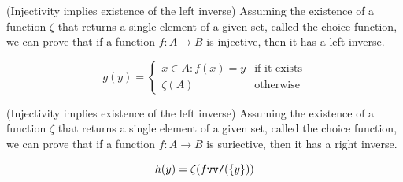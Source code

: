 \begin{lemma}(Injectivity implies existence of the left inverse)
\label{lem:injectiveInverse}
Assuming the existence of a function $\zeta$ that returns a single element of a given set, called the choice function, we can prove 
that if a function $f : A \rightarrow B$ is injective, then it has a left inverse.

\begin{equation*}
    g(y) =
    \begin{cases*}
        x \in A : f(x) = y & \text{if it exists} \\
        \zeta(A)           & \text{otherwise}
    \end{cases*}
\end{equation*}
\end{lemma}
    


\begin{lemma}(Injectivity implies existence of the left inverse)
\label{lem:suriectiveInverse}
Assuming the existence of a function $\zeta$ that returns a single element of a given set, called the choice function, we can prove 
that if a function $f : A \rightarrow B$ is suriective, then it has a right inverse.

\begin{equation*}
    h(y) = \zeta(\cev{f}(\{y\}))
\end{equation*}
\end{lemma}
